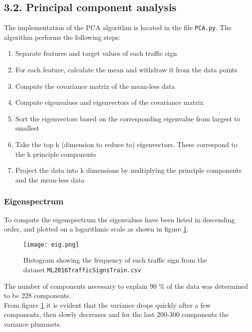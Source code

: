 \documentclass{article}
\begin{document}
\subsection{3.2. Principal component analysis}
The implementation of the PCA algorithm is located in the file \texttt{PCA.py}. The algorithm performs the following steps:
\begin{enumerate}
\item{Separate features and target values of each traffic sign}
\item{For each feature, calculate the mean and withdraw it from the data points}
\item{Compute the covariance matrix of the mean-less data}
\item{Compute eigenvalues and eigenvectors of the covariance matrix}
\item{Sort the eigenvectors based on the corresponding eigenvalue from largest to smallest}
\item{Take the top k (dimension to reduce to) eigenvectors. These correspond to the k principle components}
\item{Project the data into k dimensions by multiplying the principle components and the mean-less data}
\end{enumerate}
\subsubsection{Eigenspectrum}
To compute the eigenspectrum the eigenvalues have been listed in descending order, and plotted on a logarithmic scale as shown in figure \ref{fig:eig}.
\begin{figure}[H]
  \centering
  \texttt{[image: eig.png]}
  \caption{Histogram showing the frequency of each traffic sign from the dataset \texttt{ML2016TrafficSignsTrain.csv}}
  \label{fig:eig}
\end{figure}
The number of components necessary to explain 90 $\%$ of the data was determined to be 228 components. \\
From figure \ref{fig:eig} it is evident that the variance drops quickly after a few components, then slowly decreases and for the last 200-300 components the variance plummets.
\end{document}
